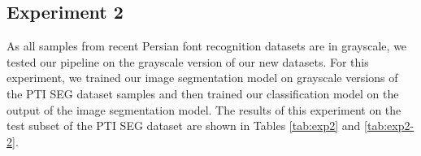 \documentclass[conference]{IEEEtran}
\begin{document}
\begin{table}[h!]
\caption{Experimental results of the classification model. \label{tab:metrics-exp1}}\centering
{}
\end{table} \subsection{Experiment 2}
As all samples from recent Persian font recognition datasets are in grayscale, we tested our pipeline on the grayscale version of our new datasets. For this experiment, we trained our image segmentation model on grayscale versions of the PTI SEG dataset samples and then trained our classification model on the output of the image segmentation model. The results of this experiment on the test subset of the PTI SEG dataset are shown in Tables \ref{tab:exp2} and \ref{tab:exp2-2}.
\end{document}

